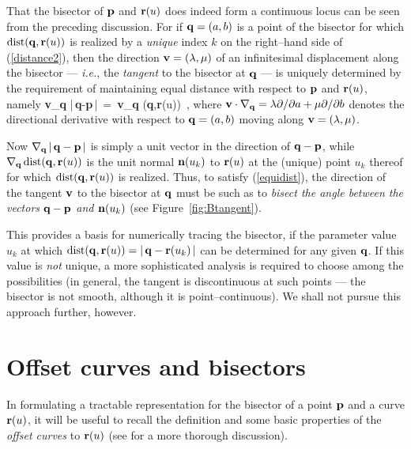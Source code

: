 That the bisector of ${\bf p}$ and ${\bf r}(u)$ does indeed form
a continuous locus can be seen from the preceding discussion. For
if ${\bf q}=(a,b)$ is a point of the bisector for which ${\rm dist}
({\bf q},{\bf r}(u))$ is realized by a {\it unique\/} index $k$
on the right--hand side of (\ref{distance2}), then the direction
${\bf v}=(\lambda,\mu)$ of an infinitesimal displacement along
the bisector --- {\it i.e.}, the {\it tangent\/} to the bisector
at ${\bf q}$ --- is uniquely determined by the requirement of
maintaining equal distance with respect to ${\bf p}$ and
${\bf r}(u)$, namely
\be \label{equidist}
{\bf v}\cdot\!\nabla_{\bf q} \; |\,{\bf q}-{\bf p}\,| \,=\,
{\bf v}\cdot\!\nabla_{\bf q} \; \dist({\bf q},{\bf r}(u)) \,,
\ee
where ${\bf v}\cdot\nabla_{\bf q}=\lambda\partial/\partial a +
\mu\partial/\partial b$ denotes the directional derivative with
respect to ${\bf q}=(a,b)$ moving along ${\bf v}=(\lambda,\mu)$.


Now $\nabla_{\bf q}\,|\,{\bf q}-{\bf p}\,|$ is simply a unit vector
in the direction of ${\bf q}-{\bf p}$, while $\nabla_{\bf q}\,{\rm dist}
({\bf q},{\bf r}(u))$ is the unit normal ${\bf n}(u_k)$ to ${\bf r}
(u)$ at the (unique) point $u_k$ thereof for which ${\rm dist}({\bf q},
{\bf r}(u))$ is realized. Thus, to satisfy (\ref{equidist}), the
direction of the tangent ${\bf v}$ to the bisector at ${\bf q}$ must
be such as to {\it bisect the angle between the vectors ${\bf q}-
{\bf p}$ and ${\bf n}(u_k)$} (see Figure~\ref{fig:Btangent}).

This provides a basis for numerically tracing the bisector, if the
parameter value $u_k$ at which ${\rm dist}({\bf q},{\bf r}(u))=|\,{\bf q}
-{\bf r}(u_k)\,|$ can be determined for any given ${\bf q}$. If
this value is {\it not\/} unique, a more sophisticated analysis is
required to choose among the possibilities (in general, the tangent
is discontinuous at such points --- the bisector is not smooth,
although it is point--continuous). We shall not pursue this approach
further, however.

\section{Offset curves and bisectors}
\label{offsets}

In formulating a tractable representation for the bisector of a
point ${\bf p}$ and a curve ${\bf r}(u)$, it will be useful to recall
the definition and some basic properties of the {\it offset curves\/}
to ${\bf r}(u)$ (see \cite{farouki90a,farouki90b} for a more thorough
discussion).


